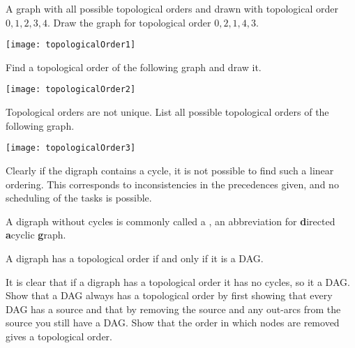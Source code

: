 \begin{Boxample}[1]
A graph with all possible topological orders and drawn with topological order $0, 1, 2, 3, 4$.  Draw the graph for topological order $0, 2, 1, 4, 3$. 
\begin{center}
\texttt{[image: topologicalOrder1]}
\end{center}
Find a topological order of the following graph and draw it.
\begin{center}
\texttt{[image: topologicalOrder2]}
\end{center}
Topological orders are not unique. List all possible topological orders of the following graph.
\begin{center}
\texttt{[image: topologicalOrder3]}
\end{center}
\end{Boxample}

%


Clearly if the digraph contains a cycle, it is not possible to find
such a linear ordering. This corresponds to inconsistencies in the
precedences given, and no scheduling of the tasks is possible.

\begin{Definition}
A digraph without cycles is commonly called a , an
abbreviation for \textbf{d}irected \textbf{a}cyclic \textbf{g}raph.  
\end{Definition}


\begin{Theorem}
\label{thm:topDAG}
A digraph has a topological order if and only if it is a DAG.
\end{Theorem}

\begin{Boxample}[6]
It is clear that if a digraph has a topological order it has no cycles, so it a DAG. 
Show that a DAG always has a topological order by first showing that every DAG has a source
and that by removing the source and any out-arcs from the source you still have a DAG. 
Show that the order in which nodes are removed gives a topological order.
\end{Boxample}

